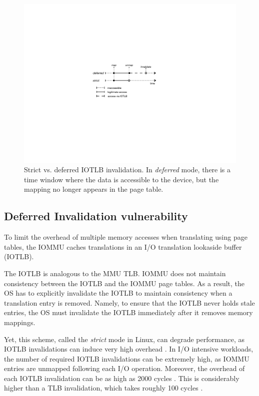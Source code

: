 \begin{figure}[t]
    \centering
    \includegraphics[width=1\columnwidth]{figs/strict.pdf}
    \caption{Strict vs. deferred IOTLB invalidation. In \emph{deferred} mode, there is a time window where the data is accessible to the device, but the mapping no longer appears in the page table.}
    \label{fig:deferred}
\end{figure}

\subsection{Deferred Invalidation vulnerability}\label{sec:deferred}

To limit the overhead of multiple memory accesses when translating \iova{} using page tables, the IOMMU caches translations in an I/O translation lookaside buffer (IOTLB). 

The IOTLB is analogous to the MMU TLB. IOMMU does not maintain consistency between the IOTLB and the IOMMU page tables. As a result, the OS has to explicitly invalidate the IOTLB to maintain consistency when a translation entry is removed. Namely, to ensure that the IOTLB never holds stale entries, the OS must invalidate the IOTLB immediately after it removes memory mappings. 

Yet, this scheme, called the \emph{strict} mode in Linux, can degrade performance, as IOTLB invalidations can induce very high overhead \cite{MMT16,MSMT18,Peleg15}. In I/O intensive workloads, the number of required IOTLB invalidations can be extremely high, as IOMMU entries are unmapped following each I/O operation. Moreover, the overhead of each IOTLB invalidation can be as high as 2000 cycles \cite{ABYTS11}. This is considerably higher than a TLB invalidation, which takes roughly 100 cycles \cite{Han14}. 

